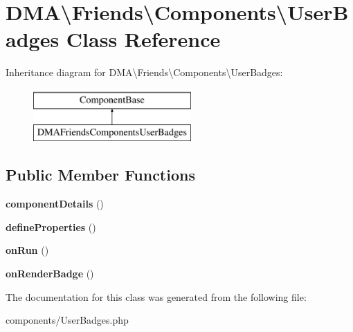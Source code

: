 \hypertarget{classDMA_1_1Friends_1_1Components_1_1UserBadges}{}\section{D\+M\+A\textbackslash{}Friends\textbackslash{}Components\textbackslash{}User\+Badges Class Reference}
\label{classDMA_1_1Friends_1_1Components_1_1UserBadges}
Inheritance diagram for D\+M\+A\textbackslash{}Friends\textbackslash{}Components\textbackslash{}User\+Badges\+:\begin{figure}[H]
\begin{center}
\leavevmode
\includegraphics[height=2.000000cm]{d8/d01/classDMA_1_1Friends_1_1Components_1_1UserBadges}
\end{center}
\end{figure}
\subsection*{Public Member Functions}
\begin{DoxyCompactItemize}
\item 
\hypertarget{classDMA_1_1Friends_1_1Components_1_1UserBadges_a6e3e13d8f4a57f8845f2c6371c8dbd58}{}{\bfseries component\+Details} ()\label{classDMA_1_1Friends_1_1Components_1_1UserBadges_a6e3e13d8f4a57f8845f2c6371c8dbd58}

\item 
\hypertarget{classDMA_1_1Friends_1_1Components_1_1UserBadges_aae166c2a0b03d1048472286433f21970}{}{\bfseries define\+Properties} ()\label{classDMA_1_1Friends_1_1Components_1_1UserBadges_aae166c2a0b03d1048472286433f21970}

\item 
\hypertarget{classDMA_1_1Friends_1_1Components_1_1UserBadges_acec1de754996d056cdc99efa976826b9}{}{\bfseries on\+Run} ()\label{classDMA_1_1Friends_1_1Components_1_1UserBadges_acec1de754996d056cdc99efa976826b9}

\item 
\hypertarget{classDMA_1_1Friends_1_1Components_1_1UserBadges_a2e7b3d79df774a45d2c433a606a2020b}{}{\bfseries on\+Render\+Badge} ()\label{classDMA_1_1Friends_1_1Components_1_1UserBadges_a2e7b3d79df774a45d2c433a606a2020b}

\end{DoxyCompactItemize}


The documentation for this class was generated from the following file\+:\begin{DoxyCompactItemize}
\item 
components/User\+Badges.\+php\end{DoxyCompactItemize}
